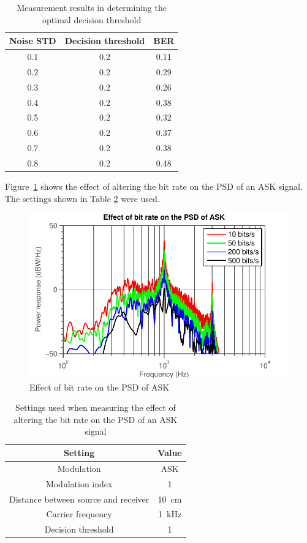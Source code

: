 \documentclass[11pt,titlepage]{report}
\begin{document}
\begin{appendices}
\begin{table}[H]
	\centering
	\caption{Measurement results in determining the optimal decision threshold}
	\label{tab:app-noise}
	\begin{tabular}{c c c}
		\hline\hline
		Noise STD & Decision threshold & BER \\
		\hline
		\num{0.1} & \num{0.2} & \num{0.11} \\ \hline
		\num{0.2} & \num{0.2} & \num{0.29} \\ \hline
		\num{0.3} & \num{0.2} & \num{0.26} \\ \hline
		\num{0.4} & \num{0.2} & \num{0.38} \\ \hline
		\num{0.5} & \num{0.2} & \num{0.32} \\ \hline
		\num{0.6} & \num{0.2} & \num{0.37} \\ \hline
		\num{0.7} & \num{0.2} & \num{0.38} \\ \hline
		\num{0.8} & \num{0.2} & \num{0.48} \\ \hline
		\hline
	\end{tabular}
\end{table}

Figure~\ref{fig:app-ask-br} shows the effect of altering the bit rate on the PSD of an ASK signal. The settings shown in Table \ref{tab:app-ask-br-settings} were used.

\begin{figure}[H]
	\begin{center}
		\includegraphics[width=0.8\linewidth]{resource/ask-br.pdf}
	\end{center}
	\caption{Effect of bit rate on the PSD of ASK}
	\label{fig:app-ask-br}
\end{figure}

\begin{table}[H]
	\centering
	\caption{Settings used when measuring the effect of altering the bit rate on the PSD of an ASK signal}
	\label{tab:app-ask-br-settings}
	\begin{tabular}{c c}
		\hline\hline
		Setting & Value \\
		\hline
		Modulation & ASK \\
		Modulation index & \num{1} \\
		Distance between source and receiver & \SI{10}{cm} \\
		Carrier frequency & \SI{1}{kHz} \\
		Decision threshold & \num{1} \\
		\hline
	\end{tabular}
\end{table}


\end{appendices}
\end{document}
